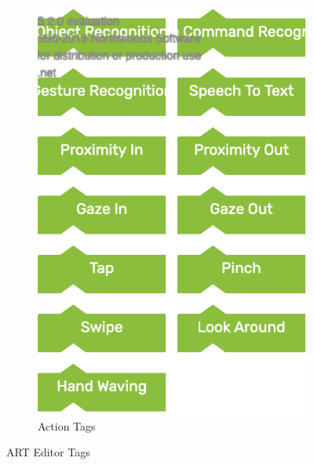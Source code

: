\begin{figure}[h]
\begin{subfigure}{0.4\textwidth}
        \includegraphics[width=\columnwidth]{Figures/Editor/action-tag.png}
        \caption{Action Tags}
        \label{fig:action-tags}
    \end{subfigure}
    \caption{ART Editor Tags}
\end{figure}
